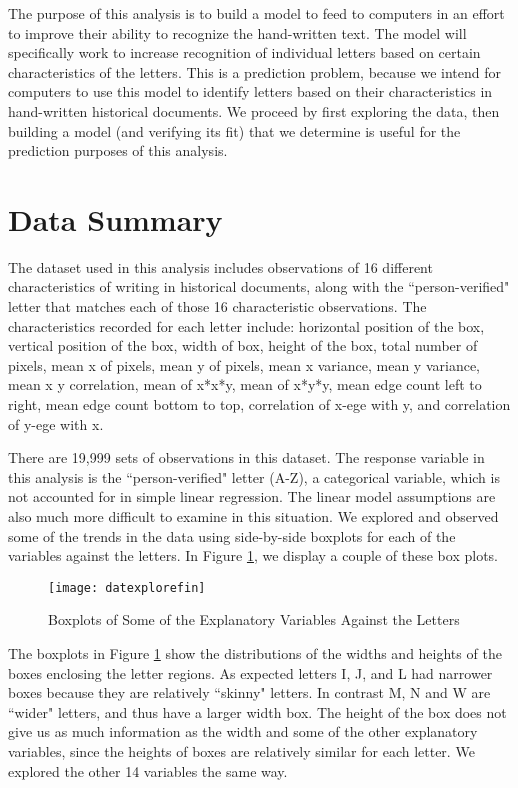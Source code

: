 \documentclass{svproc}
\begin{document}
The purpose of this analysis is to build a model to feed to computers in an effort to improve their ability to recognize the hand-written text. The model will specifically work to increase recognition of individual letters based on certain characteristics of the letters. This is a prediction problem, because we intend for computers to use this model to identify letters based on their characteristics in hand-written historical documents. We proceed by first exploring the data, then building a model (and verifying its fit) that we determine is useful for the prediction purposes of this analysis.

\section{Data Summary}

The dataset used in this analysis includes observations of 16 different characteristics of writing in historical documents, along with the ``person-verified" letter that matches each of those 16 characteristic observations. The characteristics recorded for each letter include: horizontal position of the box, vertical position of the box, width of box, height of the box, total number of pixels, mean x of pixels, mean y of pixels, mean x variance, mean y variance, mean x y correlation, mean of x*x*y, mean of x*y*y, mean edge count left to right, mean edge count bottom to top, correlation of x-ege with y, and correlation of y-ege with x. 

There are 19,999 sets of observations in this dataset. The response variable in this analysis is the ``person-verified" letter (A-Z), a categorical variable, which is not accounted for in simple linear regression. The linear model assumptions are also much more difficult to examine in this situation. We explored and observed some of the trends in the data using side-by-side boxplots for each of the variables against the letters. In Figure \ref{boxplot}, we display a couple of these box plots.

\begin{figure}
\begin{center}
\caption{Boxplots of Some of the Explanatory Variables Against the Letters}
\texttt{[image: datexplorefin]}
\label{boxplot}
\smallskip
\end{center}
\end{figure}

The boxplots in Figure \ref{boxplot} show the distributions of the widths and heights of the boxes enclosing the letter regions. As expected letters I, J, and L had narrower boxes because they are relatively ``skinny" letters. In contrast M, N and W are ``wider" letters, and thus have a larger width box. The height of the box does not give us as much information as the width and some of the other explanatory variables, since the heights of boxes are relatively similar for each letter. We explored the other 14 variables the same way. 
\end{document}
